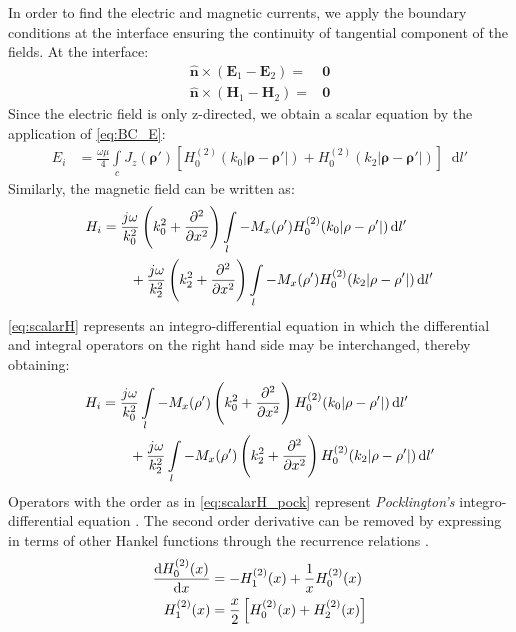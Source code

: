 \documentclass[12pt]{article}
\renewcommand{\v}[1]{\mathbf{#1}} %
\renewcommand{\O}{\omega}  %
\renewcommand{\u}{\mu}  %
\newcommand{\p}{\rho}  %
\newcommand{\x}{\times}  %
\renewcommand{\^}{\hat}  %
\newcommand*\diff{\mathop{}\!\mathrm{d}} %
\begin{document}
In order to find the electric and magnetic currents, we apply the boundary conditions at the interface ensuring the continuity of tangential component of the fields. At the interface:
%
\begin{subequations}
  \begin{align}
    \hat{\v n} \x (\v E_1 - \v E_2) ={}& \v 0
    \label{eq:BC_E}\\
    \hat{\v n} \x (\v H_1 - \v H_2) ={}& \v 0
    \label{eq:BC_H}
  \end{align}
  \label{eq:BC}
\end{subequations}
%
Since the electric field is only z-directed, we obtain a scalar equation by the application of \eqref{eq:BC_E}:
%
\begin{align}
  E_i &= \frac{\O \u}{4} \int\limits_c J_z(\v \p') \left[ H_0^{(2)}(k_0 |\v \p - \v \p'|) + H_0^{(2)}(k_2 |\v \p - \v \p'|)\right] \diff{l'}
  \label{eq:scalarE}
\end{align}
%
Similarly, the magnetic field can be written as:
%
\begin{align}
  H_i &=  \frac{j \O}{k_0^2}\left(k_0^2 +  \pdv[2]{}{x} \right) \int\limits_{l} -M_x(\v \p') H_0^{(2)}(k_0 |\v \p - \v \p'|) \diff{l'} \notag\\
  &\qquad + \frac{j \O}{k_2^2}\left(k_2^2 +  \pdv[2]{}{x} \right) \int\limits_{l} -M_x(\v \p') H_0^{(2)}(k_2 |\v \p - \v \p'|) \diff{l'}
  \label{eq:scalarH}
\end{align}
%
\eqref{eq:scalarH} represents an integro-differential equation in which the differential and integral operators on the right hand side may be interchanged, thereby obtaining:
%
\begin{align}
  H_i &=  \frac{j \O}{k_0^2} \int\limits_{l} -M_x(\v \p') \left(k_0^2 +  \pdv[2]{}{x} \right) H_0^{(2)}(k_0 |\v \p - \v \p'|) \diff{l'} \notag\\
  &\qquad + \frac{j \O}{k_2^2} \int\limits_{l} -M_x(\v \p') \left(k_2^2 +  \pdv[2]{}{x} \right) H_0^{(2)}(k_2 |\v \p - \v \p'|) \diff{l'}
  \label{eq:scalarH_pock}
\end{align}
%
Operators with the order as in \eqref{eq:scalarH_pock} represent \emph{Pocklington's} integro-differential equation \cite{}. The second order derivative can be removed by expressing in terms of other Hankel functions through the recurrence relations \cite[p. 361]{}.
%
\begin{subequations}
  \begin{align}
    \dv{H_0^{(2)}(x)}{x} &= -H_{1}^{(2)}(x) + \frac{1}{x} H_0^{(2)}(x)
    \label{eq:Hankel_ID1}\\
    H_{1}^{(2)}(x)  &= \frac{x}{2} \left[H_{0}^{(2)}(x) + H_{2}^{(2)}(x)\right]
    \label{eq:Hankel_ID2}
  \end{align}
  \label{eq:Hankel_ID}
\end{subequations}
\end{document}
